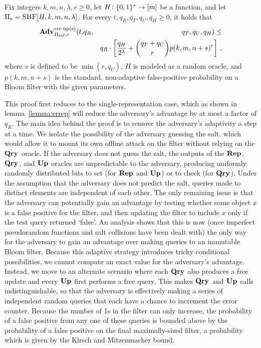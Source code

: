 \begin{theorem}\label{thm:bf-priv-salt-bound}
Fix integers $k, m, n, \lambda, r\geq 0$, let $H \colon \{0,1\}^* \to [m]$ be a function, and let $\mathrm{\Pi}_s = \textsc{SBF}[H,k,m,n,\lambda]$.
  For every $t, q_R, q_T, q_U, q_H \geq 0$, it holds that
  \begin{eqnarray*}
    \Adv{\erreps}_{\struct_\saltybloom,r}(t,&q_R,& q_T, q_U, q_H) \leq \\ && q_R \cdot
     \left[
      \frac{q_H}{2^\lambda} +
      {\dbinom{q_T+q_U}{r}} p(k, m, n+s)^r
    \right] \,,
\end{eqnarray*}
where $s$ is defined to be $\min(r,q_U)$, $H$ is modeled as a random oracle, and $p(k, m, n+s)$ is the standard, non-adaptive false-positive probability on a Bloom filter with the given parameters.
\end{theorem}

This proof first reduces to the single-representation case, which as shown in
lemma~\ref{lemma:errep} will reduce the adversary's advantage by at most a
factor of $q_R$. The main idea behind the proof is to remove the adversary's
adaptivity a step at a time. We isolate the possibility of the adversary
guessing the salt, which would allow it to mount its own offline attack on the
filter without relying on the $\mathbf{Qry}\hspace{0.5pt}$ oracle. If the adversary does not guess
the salt, the outputs of the $\mathbf{Rep}\hspace{0.5pt}$, $\mathbf{Qry}\hspace{0.5pt}$, and $\mathbf{Up}\hspace{0.5pt}$ oracles are
unpredictable to the adversary, producing uniformly randomly distributed bits to
set (for $\mathbf{Rep}\hspace{0.5pt}$ and $\mathbf{Up}\hspace{0.5pt}$) or to check (for $\mathbf{Qry}\hspace{0.5pt}$). Under the assumption
that the adversary does not predict the salt, queries made to distinct elements
are independent of each other. The only remaining issue is that the adversary
can potentially gain an advantage by testing whether some object $x$ is a false
positive for the filter, and then updating the filter to include $x$ only if the
test query returned `false'. An analysis shows that this is now (once imperfect
pseudorandom functions and salt collisions have been dealt with) the only way
for the adversary to gain an advantage over making queries to an immutable Bloom
filter. Because this adaptive strategy introduces tricky conditional
possibilities, we cannot compute an exact value for the adversary's advantage.
Instead, we move to an alternate scenario where each $\mathbf{Qry}\hspace{0.5pt}$ also produces a
free update and every $\mathbf{Up}\hspace{0.5pt}$ first performs a free query. This makes $\mathbf{Qry}\hspace{0.5pt}$ and
$\mathbf{Up}\hspace{0.5pt}$ calls indistinguishable, so that the adversary is effectively making a
series of independent random queries that each have a chance to increment the
error counter. Because the number of 1s in the filter can only increase, the
probability of a false positive from any one of these queries is bounded above
by the probability of a false positive on the final maximally-sized filter, a
probability which is given by the Kirsch and Mitzenmacher bound.

